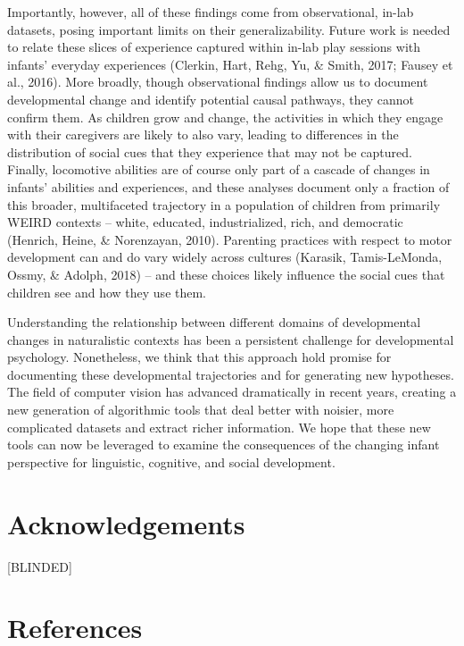 \documentclass[english,man]{apa6}
\begin{document}
Importantly, however, all of these findings come from observational,
in-lab datasets, posing important limits on their generalizability.
Future work is needed to relate these slices of experience captured
within in-lab play sessions with infants' everyday experiences (Clerkin,
Hart, Rehg, Yu, \& Smith, 2017; Fausey et al., 2016). More broadly,
though observational findings allow us to document developmental change
and identify potential causal pathways, they cannot confirm them. As
children grow and change, the activities in which they engage with their
caregivers are likely to also vary, leading to differences in the
distribution of social cues that they experience that may not be
captured. Finally, locomotive abilities are of course only part of a
cascade of changes in infants' abilities and experiences, and these
analyses document only a fraction of this broader, multifaceted
trajectory in a population of children from primarily WEIRD contexts --
white, educated, industrialized, rich, and democratic (Henrich, Heine,
\& Norenzayan, 2010). Parenting practices with respect to motor
development can and do vary widely across cultures (Karasik,
Tamis-LeMonda, Ossmy, \& Adolph, 2018) -- and these choices likely
influence the social cues that children see and how they use them.

Understanding the relationship between different domains of
developmental changes in naturalistic contexts has been a persistent
challenge for developmental psychology. Nonetheless, we think that this
approach hold promise for documenting these developmental trajectories
and for generating new hypotheses. The field of computer vision has
advanced dramatically in recent years, creating a new generation of
algorithmic tools that deal better with noisier, more complicated
datasets and extract richer information. We hope that these new tools
can now be leveraged to examine the consequences of the changing infant
perspective for linguistic, cognitive, and social development.

\section{Acknowledgements}\label{acknowledgements}

{[}BLINDED{]}

\newpage

\section{References}\label{references}
\end{document}
